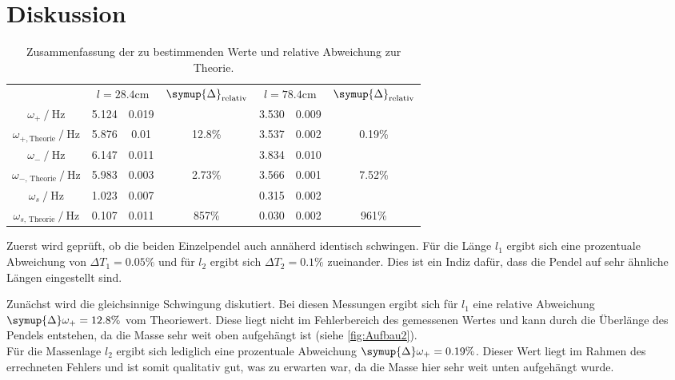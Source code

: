 \section{Diskussion}
\label{sec:Diskussion}
\begin{table}
    \centering
    \caption{Zusammenfassung der zu bestimmenden Werte und relative Abweichung zur Theorie.}
    \begin{tabular}{c S @{${}\pm{}$} S c S[table-format=2.3] @{${}\pm{}$} S[table-format=1.3] c}
    \toprule
    &  &  &  & \\
    \cmidrule(lr){2-3}\cmidrule(lr){4-4}\cmidrule(lr){5-6}\cmidrule(lr){7-7}
    {$\omega_+ \mathbin{/} \unit{\hertz}$}                     & 5.124 & 0.019 &  & 3.530 & 0.009 & \\
    {$\omega_{+,\text{Theorie}} \mathbin{/} \unit{\hertz}$}    & 5.876 & 0.01 & 12.8\% & 3.537 & 0.002 & 0.19\% \\
    {$\omega_- \mathbin{/} \unit{\hertz}$}                     & 6.147 & 0.011 & & 3.834 & 0.010 & \\
    {$\omega_{{-}\text{, Theorie}} \mathbin{/} \unit{\hertz}$} & 5.983 & 0.003 & 2.73\% & 3.566 & 0.001 & 7.52\% \\
    {$\omega_s \mathbin{/} \unit{\hertz}$}                     & 1.023 & 0.007 & & 0.315 & 0.002 & \\
    {$\omega_{{s}\text{, Theorie}} \mathbin{/} \unit{\hertz}$} & 0.107 & 0.011 & 857\% & 0.030 & 0.002 & 961\% \\
    \bottomrule
    \end{tabular}
\end{table}
Zuerst wird geprüft, ob die beiden Einzelpendel auch annäherd identisch schwingen. Für die Länge $l_1$ ergibt sich eine prozentuale Abweichung von $\Delta T_{1} = 0.05\%$ und für $l_2$ ergibt sich 
$\Delta T_{2} = 0.1\%$ zueinander. Dies ist ein Indiz dafür, dass die Pendel auf sehr ähnliche Längen eingestellt sind.

Zunächst wird die gleichsinnige Schwingung diskutiert. Bei diesen Messungen ergibt sich für $l_1$ eine relative Abweichung 
$\symup{\Delta}\omega_{+} = 12.8\%$ vom Theoriewert. Diese liegt nicht im Fehlerbereich des gemessenen Wertes und kann durch die Überlänge des Pendels entstehen, da die Masse sehr
weit oben aufgehängt ist (siehe \autoref{fig:Aufbau2}).\\ Für die Massenlage $l_2$ ergibt sich lediglich eine prozentuale Abweichung $\symup{\Delta}\omega_{+} = 0.19\%$. Dieser Wert
liegt im Rahmen des errechneten Fehlers und ist somit qualitativ gut, was zu erwarten war, da die Masse hier sehr weit unten aufgehängt wurde.


